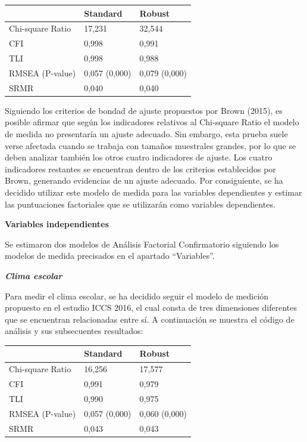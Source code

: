 \documentclass[12pt,twoside]{templates/facsothesis}
\begin{document}
\begin{longtable}[]{@{}lll@{}}
\toprule
& Standard & Robust \\
\midrule
\endhead
Chi-square Ratio & 17,231 & 32,544 \\
CFI & 0,998 & 0,991 \\
TLI & 0,998 & 0,988 \\
RMSEA (P-value) & 0,057 (0,000) & 0,079 (0,000) \\
SRMR & 0,040 & 0,040 \\
\bottomrule
\end{longtable}

Siguiendo los criterios de bondad de ajuste propuestos por Brown (2015), es posible afirmar que según los indicadores relativos al Chi-square Ratio el modelo de medida no presentaría un ajuste adecuado. Sin embargo, esta prueba suele verse afectada cuando se trabaja con tamaños muestrales grandes, por lo que se deben analizar también los otros cuatro indicadores de ajuste. Los cuatro indicadores restantes se encuentran dentro de los criterios establecidos por Brown, generando evidencias de un ajuste adecuado. Por consiguiente, se ha decidido utilizar este modelo de medida para las variables dependientes y estimar las puntuaciones factoriales que se utilizarán como variables dependientes.

\textbf{Variables independientes}

Se estimaron dos modelos de Análisis Factorial Confirmatorio siguiendo los modelos de medida precisados en el apartado ``Variables''.

\textbf{\emph{Clima escolar}}

Para medir el clima escolar, se ha decidido seguir el modelo de medición propuesto en el estudio ICCS 2016, el cual consta de tres dimensiones diferentes que se encuentran relacionadas entre sí. A continuación se muestra el código de análisis y sus subsecuentes resultados:

\begin{longtable}[]{@{}lll@{}}
\toprule
& Standard & Robust \\
\midrule
\endhead
Chi-square Ratio & 16,256 & 17,577 \\
CFI & 0,991 & 0,979 \\
TLI & 0,990 & 0,975 \\
RMSEA (P-value) & 0,057 (0,000) & 0,060 (0,000) \\
SRMR & 0,043 & 0,043 \\
\bottomrule
\end{longtable}
\end{document}
